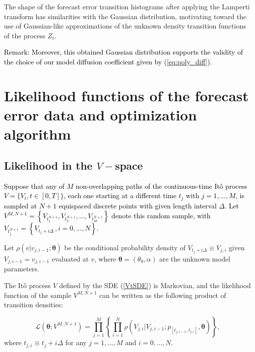 \documentclass[11pt]{article}
\theoremstyle{definition}
\newcommand{\red}{\textcolor{black}}
\begin{document}
The shape of the forecast error transition histograms after applying the Lamperti transform has similarities with the Gaussian distribution, motivating toward the use of Gaussian-like approximations of the unknown density transition functions of the process $Z_t$.

\red{Remark: Moreover, this obtained Gaussian distribution supports the validity of the choice of our model diffusion coefficient given by (\ref{eq:poly_diff}). 
}



\section{ Likelihood functions of the forecast error data and optimization algorithm} \label{Section_5} 

\subsection{Likelihood in the $V-$space}

\red{Suppose that any of $M$ non-overlapping paths of the continuous-time It\^{o} process $V = \{ V_t, t  \in [0,T] \}$, each one starting at a different time $t_j$ with $j = 1, \dots, M$, is sampled at $N + 1$ equispaced discrete points with given length interval $\Delta$. Let $ V^{M,N + 1}=\left\{ V_{t_1^{N + 1}} , V_{t_2^{N + 1}} ,\ldots , V_{t_M^{N + 1}} \right\}$ denote this random sample, with $V_{t_j^{N + 1}} =\left\{ V_{t_j + i \Delta}\,, i = 0, \ldots, N \right\}$.}

Let $\rho(v \vert v_{j, i-1} ; \bm{\theta})$ be the conditional probability density of $V_{t_j + i \Delta} \equiv V_{j, i}$ given $V_{j, i-1} = v_{j, i-1}$ evaluated at $v$, where $\bm{\theta} = (\theta_0, \alpha)$ are the unknown model parameters.

The It\^{o} process $V$ defined by the SDE (\ref{VtSDE}) is Markovian, and the likelihood function of the sample $ V^{M,N + 1}$ can be written as the following product of transition densities:  

\begin{equation}
\mathcal{L}\left(\bm{\theta}; V^{M,N +1}\right) = \prod\limits_{j=1}^M \left\{ \prod\limits_{i=1}^N \rho \left( {V_{j, i}| V_{j, i-1}} ; p_{[t_{j,  i-1}, t_{j , i} ]},  \bm{\theta} \right)    \right\},
\label{likelihood}
\end{equation}
where $t_{j ,i} \equiv  t_j + i \Delta$ for any $j = 1, \ldots, M$ and $i = 0, \ldots, N$. \\
\end{document}
